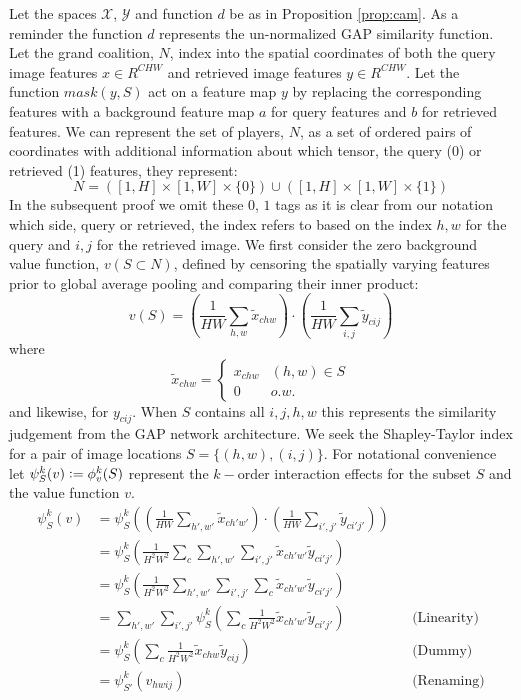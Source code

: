 \documentclass{article} %
\newcommand{\defeq}{\vcentcolon=}
\begin{document}
 Let the spaces $\mathcal{X}$, $\mathcal{Y}$ and function $d$ be as in Proposition \ref{prop:cam}. As a reminder the function $d$ represents the un-normalized GAP similarity function. Let the grand coalition, $N$, index into the spatial coordinates of both the query image features $x \in R^{CHW}$ and retrieved image features $y\in R^{CHW}$. Let the function $mask(y, S)$ act on a feature map $y$ by replacing the corresponding features with a background feature map $a$ for query features and $b$ for retrieved features. We can represent the set of players, $N$, as a set of ordered pairs of coordinates with additional information about which tensor, the query (0) or retrieved (1) features, they represent:
\begin{equation}
    N = ([1,H] \times [1,W] \times \{0\}) \cup ([1,H] \times [1,W]  \times \{1\})
\end{equation}  
In the subsequent proof we omit these $0$, $1$ tags as it is clear from our notation which side, query or retrieved, the index refers to based on the index $h,w$ for the query and $i,j$ for the retrieved image. We first consider the zero background value function, $v(S \subset N)$, defined by censoring the spatially varying features prior to global average pooling and comparing their inner product:
$$ v(S) = \left( \frac{1}{HW}\sum_{h,w} \tilde{x}_{chw} \right) \cdot \left( \frac{1}{HW}\sum_{i,j} \tilde{y}_{cij} \right) $$
where 
\[ \tilde{x}_{chw} = \begin{cases} 
      x_{chw}  & (h,w) \in S \\
      0 & o.w. 
   \end{cases}
\]
and likewise, for $y_{cij}$. When $S$ contains all $i,j,h,w$ this represents the similarity judgement from the GAP network architecture. We seek the Shapley-Taylor index for a pair of image locations $S =\{ (h,w), (i, j) \}$. For notational convenience let $\psi^k_S (v) \defeq \phi^k_v(S)$ represent the $k-$order interaction effects for the subset $S$ and the value function $v$.
\begin{align*}
\psi_S^k(v) &= \psi_S^k\left( \left(  \frac{1}{HW}\sum_{h',w'} \tilde{x}_{ch'w'} \right) \cdot \left(  \frac{1}{HW}\sum_{i',j'} \tilde{y}_{ci'j'} \right) \right) \\
&= \psi_S^k\left( \frac{1}{H^2W^2} \sum_c \sum_{h',w'} \sum_{i',j'} \tilde{x}_{ch'w'} \tilde{y}_{ci'j'} \right) \\
&= \psi_S^k\left( \frac{1}{H^2W^2}\sum_{h',w'} \sum_{i',j'} \sum_c \tilde{x}_{ch'w'} \tilde{y}_{ci'j'} \right) \\
&=  \sum_{h',w'} \sum_{i',j'} \psi_S^k\left( \sum_c \frac{1}{H^2W^2} \tilde{x}_{ch'w'} \tilde{y}_{ci'j'} \right)  && \text{(Linearity)}\\
&= \psi_S^k\left( \sum_c \frac{1}{H^2W^2} \tilde{x}_{chw} \tilde{y}_{cij} \right)  && \text{(Dummy)}\\
&= \psi_{S'}^k\left( v_{hwij} \right)  && \text{(Renaming)}\\
\end{align*}
\end{document}
